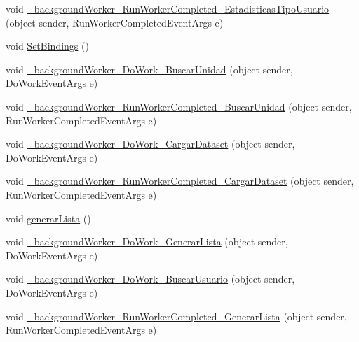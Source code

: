 \begin{DoxyCompactItemize}
\item 
void \hyperlink{class_proyecto___integrador__3_1_1_reportes_1_1_reporte_frecuencia_de_uso_a179c5612b58f592d8599eb91de5dee49}{\-\_\-background\-Worker\-\_\-\-Run\-Worker\-Completed\-\_\-\-Estadisticas\-Tipo\-Usuario} (object sender, Run\-Worker\-Completed\-Event\-Args e)
\item 
void \hyperlink{class_proyecto___integrador__3_1_1_reportes_1_1_reporte_frecuencia_de_uso_aefbfda56e68a84e456a7923b48b53c32}{Set\-Bindings} ()
\item 
void \hyperlink{class_proyecto___integrador__3_1_1_reportes_1_1_reporte_frecuencia_de_uso_af1670c725412822eadab58e78323de42}{\-\_\-background\-Worker\-\_\-\-Do\-Work\-\_\-\-Buscar\-Unidad} (object sender, Do\-Work\-Event\-Args e)
\item 
void \hyperlink{class_proyecto___integrador__3_1_1_reportes_1_1_reporte_frecuencia_de_uso_addf6a2f2f936125f48c64b9e5245e153}{\-\_\-background\-Worker\-\_\-\-Run\-Worker\-Completed\-\_\-\-Buscar\-Unidad} (object sender, Run\-Worker\-Completed\-Event\-Args e)
\item 
void \hyperlink{class_proyecto___integrador__3_1_1_reportes_1_1_reporte_frecuencia_de_uso_a55002e8c14e9ba578b5831767447cdd3}{\-\_\-background\-Worker\-\_\-\-Do\-Work\-\_\-\-Cargar\-Dataset} (object sender, Do\-Work\-Event\-Args e)
\item 
void \hyperlink{class_proyecto___integrador__3_1_1_reportes_1_1_reporte_frecuencia_de_uso_a7f78d38cf4064aa67d74c183b574e2c6}{\-\_\-background\-Worker\-\_\-\-Run\-Worker\-Completed\-\_\-\-Cargar\-Dataset} (object sender, Run\-Worker\-Completed\-Event\-Args e)
\item 
void \hyperlink{class_proyecto___integrador__3_1_1_reportes_1_1_reporte_frecuencia_de_uso_a3de6e539551d839570776f07debecacb}{generar\-Lista} ()
\item 
void \hyperlink{class_proyecto___integrador__3_1_1_reportes_1_1_reporte_frecuencia_de_uso_a78fff58c4b0b7e6d610313c107fc5de6}{\-\_\-background\-Worker\-\_\-\-Do\-Work\-\_\-\-Generar\-Lista} (object sender, Do\-Work\-Event\-Args e)
\item 
void \hyperlink{class_proyecto___integrador__3_1_1_reportes_1_1_reporte_frecuencia_de_uso_a5a5ae9866b6f2c5460930cd9a04a2ab1}{\-\_\-background\-Worker\-\_\-\-Do\-Work\-\_\-\-Buscar\-Usuario} (object sender, Do\-Work\-Event\-Args e)
\item 
void \hyperlink{class_proyecto___integrador__3_1_1_reportes_1_1_reporte_frecuencia_de_uso_a4b950282d32a7745be1b30b79621183b}{\-\_\-background\-Worker\-\_\-\-Run\-Worker\-Completed\-\_\-\-Generar\-Lista} (object sender, Run\-Worker\-Completed\-Event\-Args e)

\end{DoxyCompactItemize}
